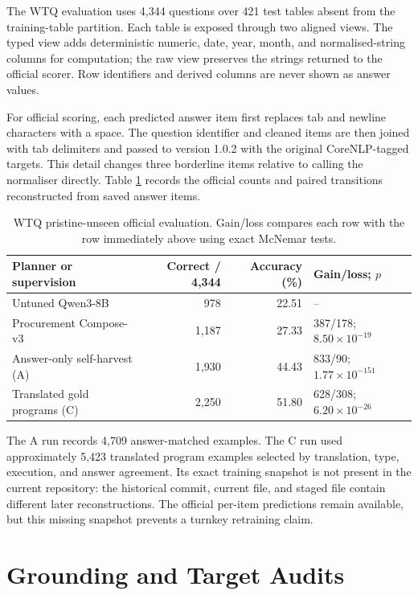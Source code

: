 The WTQ evaluation uses 4,344 questions over 421 test tables absent from the training-table
partition.  Each table is exposed through two aligned views.  The typed view adds deterministic
numeric, date, year, month, and normalised-string columns for computation; the raw view preserves
the strings returned to the official scorer.  Row identifiers and derived columns are never shown
as answer values.

For official scoring, each predicted answer item first replaces tab and newline characters with a
space.  The question identifier and cleaned items are then joined with tab delimiters and passed to
 version 1.0.2 with the original CoreNLP-tagged targets.
This detail changes three borderline items relative to calling the normaliser directly.  Table
\ref{tab:wtq-official} records the official counts and paired transitions reconstructed from saved
answer items.

\begin{table}[h]
  \centering
  \caption{WTQ pristine-unseen official evaluation.  Gain/loss compares each row with the row
  immediately above using exact McNemar tests.}
  \label{tab:wtq-official}
  \small
  \begin{tabular}{lrrl}
    \toprule
    Planner or supervision & Correct / 4,344 & Accuracy (\%) & Gain/loss; $p$ \\
    \midrule
    Untuned Qwen3-8B & 978 & 22.51 & -- \\
    Procurement Compose-v3 & 1,187 & 27.33 & 387/178; $8.50\times10^{-19}$ \\
    Answer-only self-harvest (A) & 1,930 & 44.43 & 833/90; $1.77\times10^{-151}$ \\
    Translated gold programs (C) & 2,250 & 51.80 & 628/308; $6.20\times10^{-26}$ \\
    \bottomrule
  \end{tabular}
\end{table}

The A run records 4,709 answer-matched examples.  The C run used approximately 5,423 translated
program examples selected by translation, type, execution, and answer agreement.  Its exact
training snapshot is not present in the current repository: the historical commit, current file,
and staged file contain different later reconstructions.  The official per-item predictions remain
available, but this missing snapshot prevents a turnkey retraining claim.

\section{Grounding and Target Audits}
\label{app:grounding-audit}


